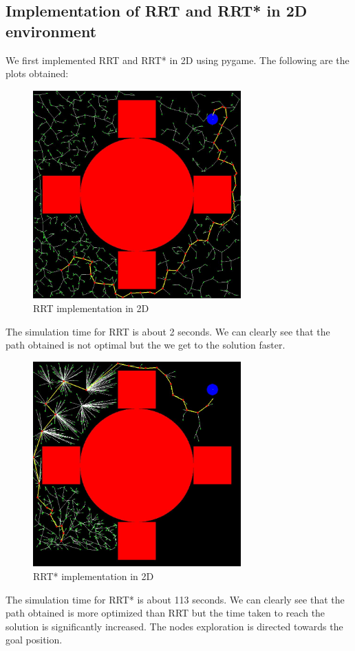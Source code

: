 \documentclass{IEEEtran}
\begin{document}
\subsection{\textbf{Implementation of RRT and RRT* in 2D environment}}
We first implemented RRT and RRT* in 2D using pygame. The following are the plots obtained:
\begin{figure}[h]
    \centering
    \includegraphics[width=8cm]{rrt2d}
    \caption{RRT implementation in 2D}
    \label{fig:RRT implementation in 2D}
\end{figure}
\newline 
The simulation time for RRT is about 2 seconds. We can clearly see that the path obtained is not optimal but the we get to the solution faster.
\newpage
\begin{figure}[h]
    \centering
    \includegraphics[width=8cm]{rrt2d1}
    \caption{RRT* implementation in 2D}
    \label{fig:RRT* implementation in 2D}
\end{figure} 
The simulation time for RRT* is about 113 seconds. We can clearly see that the path obtained is more optimized than RRT but the time taken to reach the solution is significantly increased. The nodes exploration is directed towards the goal position.
\end{document}
